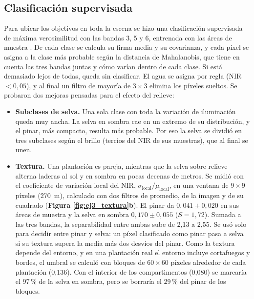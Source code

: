     \subsection{Clasificación supervisada}

        Para ubicar los objetivos en toda la escena se hizo una clasificación supervisada de máxima verosimilitud con las bandas 3, 5 y 6, entrenada con las áreas de muestra \cite{ej3_richards}. De cada clase se calcula su firma media y su covarianza, y cada píxel se asigna a la clase más probable según la distancia de Mahalanobis, que tiene en cuenta las tres bandas juntas y cómo varían dentro de cada clase. Si está demasiado lejos de todas, queda sin clasificar. El agua se asigna por regla (NIR~$< 0{,}05$), y al final un filtro de mayoría de $3 \times 3$ elimina los píxeles sueltos. Se probaron dos mejoras pensadas para el efecto del relieve:

        \begin{itemize}
            \item \textbf{Subclases de selva.} Una sola clase con toda la variación de iluminación queda muy ancha. La selva en sombra cae en un extremo de su distribución, y el pinar, más compacto, resulta más probable. Por eso la selva se dividió en tres subclases según el brillo (tercios del NIR de sus muestras), que al final se unen.
            \item \textbf{Textura.} Una plantación es pareja, mientras que la selva sobre relieve alterna laderas al sol y en sombra en pocas decenas de metros. Se midió con el coeficiente de variación local del NIR, $\sigma_{\text{local}} / \mu_{\text{local}}$, en una ventana de $9 \times 9$ píxeles (270~m), calculado con dos filtros de promedio, de la imagen y de su cuadrado (\textbf{Figura \ref{fig:ej3_textura}b}). El pinar da $0{,}041 \pm 0{,}020$ en sus áreas de muestra y la selva en sombra $0{,}170 \pm 0{,}055$ ($S = 1{,}72$). Sumada a las tres bandas, la separabilidad entre ambas sube de 2,13 a 2,55. Se usó solo para decidir entre pinar y selva: un píxel clasificado como pinar pasa a selva si su textura supera la media más dos desvíos del pinar. Como la textura depende del entorno, y en una plantación real el entorno incluye cortafuegos y bordes, el umbral se calculó con bloques de $60 \times 60$ píxeles alrededor de cada plantación (0,136). Con el interior de los compartimentos (0,080) se marcaría el 97\,\% de la selva en sombra, pero se borraría el 29\,\% del pinar de los bloques.
        \end{itemize}

